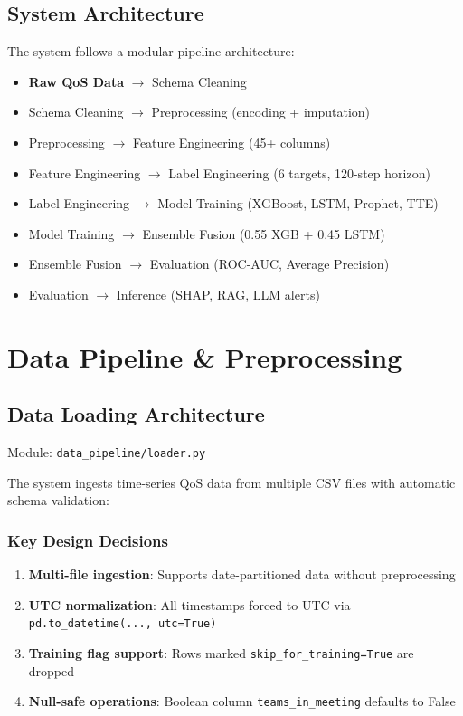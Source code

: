 \documentclass[11pt,a4paper,oneside]{report}
\begin{document}
\section{System Architecture}

The system follows a modular pipeline architecture:

\begin{itemize}
    \item \textbf{Raw QoS Data} $\rightarrow$ Schema Cleaning
    \item Schema Cleaning $\rightarrow$ Preprocessing (encoding + imputation)
    \item Preprocessing $\rightarrow$ Feature Engineering (45+ columns)
    \item Feature Engineering $\rightarrow$ Label Engineering (6 targets, 120-step horizon)
    \item Label Engineering $\rightarrow$ Model Training (XGBoost, LSTM, Prophet, TTE)
    \item Model Training $\rightarrow$ Ensemble Fusion (0.55 XGB + 0.45 LSTM)
    \item Ensemble Fusion $\rightarrow$ Evaluation (ROC-AUC, Average Precision)
    \item Evaluation $\rightarrow$ Inference (SHAP, RAG, LLM alerts)
\end{itemize}
\newpage
\chapter{Data Pipeline \& Preprocessing}

\section{Data Loading Architecture}

Module: \texttt{data\_pipeline/loader.py}

The system ingests time-series QoS data from multiple CSV files with automatic schema validation:

\subsection{Key Design Decisions}

\begin{enumerate}
    \item \textbf{Multi-file ingestion}: Supports date-partitioned data without preprocessing
    \item \textbf{UTC normalization}: All timestamps forced to UTC via \texttt{pd.to\_datetime(..., utc=True)}
    \item \textbf{Training flag support}: Rows marked \texttt{skip\_for\_training=True} are dropped
    \item \textbf{Null-safe operations}: Boolean column \texttt{teams\_in\_meeting} defaults to False
\end{enumerate}
\end{document}
